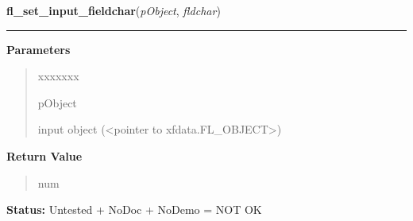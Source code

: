 \hspace{.8\funcindent}\begin{boxedminipage}{\funcwidth}

    \raggedright \textbf{fl\_set\_input\_fieldchar}(\textit{pObject}, \textit{fldchar})

    \vspace{-1.5ex}

    \rule{\textwidth}{0.5\fboxrule}
\setlength{\parskip}{2ex}
\setlength{\parskip}{1ex}
      \textbf{Parameters}
      \vspace{-1ex}

      \begin{quote}
        \begin{Ventry}{xxxxxxx}

          \item[pObject]

          input object ({\textless}pointer to 
          xfdata.FL\_OBJECT{\textgreater})

        \end{Ventry}

      \end{quote}

      \textbf{Return Value}
    \vspace{-1ex}

      \begin{quote}
      num

      \end{quote}

\textbf{Status:} Untested + NoDoc + NoDemo = NOT OK



    \end{boxedminipage}

    \label{xformslib:library:fl_get_input_topline}

    \vspace{0.5ex}

